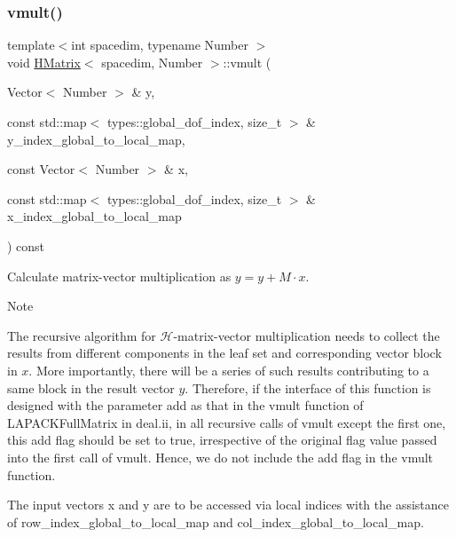 \mbox{\label{classHMatrix_a690927f0810d85d08f0ab2239e405ffe}} 
\subsubsection{\texorpdfstring{vmult()}{vmult()}\hspace{0.1cm}{\footnotesize\ttfamily [3/4]}}
{\footnotesize\ttfamily template$<$int spacedim, typename Number $>$ \\
void \hyperlink{classHMatrix}{H\+Matrix}$<$ spacedim, Number $>$\+::vmult (\begin{DoxyParamCaption}\item[{Vector$<$ Number $>$ \&}]{y,  }\item[{const std\+::map$<$ types\+::global\+\_\+dof\+\_\+index, size\+\_\+t $>$ \&}]{y\+\_\+index\+\_\+global\+\_\+to\+\_\+local\+\_\+map,  }\item[{const Vector$<$ Number $>$ \&}]{x,  }\item[{const std\+::map$<$ types\+::global\+\_\+dof\+\_\+index, size\+\_\+t $>$ \&}]{x\+\_\+index\+\_\+global\+\_\+to\+\_\+local\+\_\+map }\end{DoxyParamCaption}) const}

Calculate matrix-\/vector multiplication as $y = y + M \cdot x$.


\begin{DoxyDescription}
\item[Note ]
\begin{DoxyEnumerate}
\item The recursive algorithm for $\mathcal{H}$-\/matrix-\/vector multiplication needs to collect the results from different components in the leaf set and corresponding vector block in $x$. More importantly, there will be a series of such results contributing to a same block in the result vector $y$. Therefore, if the interface of this function is designed with the parameter {\ttfamily add} as that in the {\ttfamily vmult} function of {\ttfamily L\+A\+P\+A\+C\+K\+Full\+Matrix} in deal.\+ii, in all recursive calls of {\ttfamily vmult} except the first one, this {\ttfamily add} flag should be set to {\ttfamily true}, irrespective of the original flag value passed into the first call of {\ttfamily vmult}. Hence, we do not include the {\ttfamily add} flag in the {\ttfamily vmult} function.
\item The input vectors {\ttfamily x} and {\ttfamily y} are to be accessed via local indices with the assistance of {\ttfamily row\+\_\+index\+\_\+global\+\_\+to\+\_\+local\+\_\+map} and {\ttfamily col\+\_\+index\+\_\+global\+\_\+to\+\_\+local\+\_\+map}. 
\end{DoxyEnumerate}
\end{DoxyDescription}


